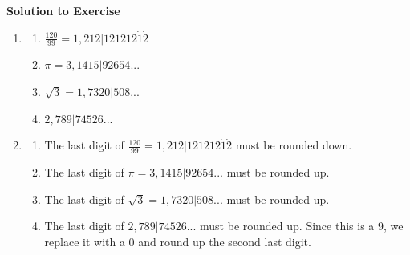 {\begin{mdframed}[linewidth=4, leftmargin=40, rightmargin=40]
\begin{exercise}
      
      \vspace{5pt}
      \label{m38349*solfhsst!!!underscore!!!id212}\noindent\textbf{Solution to Exercise } \label{m38349*listfhsst!!!underscore!!!id212}\begin{enumerate}[noitemsep, label=\textbf{Step} \textbf{\arabic*}. ] 
            \leftskip=20pt\rightskip=\leftskip\item  
      \label{m38349*id325360}\begin{enumerate}[noitemsep, label=\textbf{\alph*}. ] 
            \leftskip=20pt\rightskip=\leftskip\label{m38349*uid8}\item 
          \begin{math}\frac{120}{99}=1,212|121212\dot{1}\dot{2}\end{math}
        \label{m38349*uid9}\item 
          \begin{math}\pi =3,1415|92654...\end{math}
        \label{m38349*uid10}\item 
          \begin{math}\sqrt{3}=1,7320|508...\end{math}
        \item \begin{math}2,789|74526...\end{math}\end{enumerate}
        
      \item  
      \label{m38349*id325490}\begin{enumerate}[noitemsep, label=\textbf{\alph*}. ] 
            \leftskip=20pt\rightskip=\leftskip\label{m38349*uid11}\item The last digit of \begin{math}\frac{120}{99}=1,212|121212\dot{1}\dot{2}\end{math}  must be rounded down.
\label{m38349*uid12}\item The last digit of \begin{math}\pi =3,1415|92654...\end{math} must be rounded up.
\label{m38349*uid13}\item The last digit of \begin{math}\sqrt{3}=1,7320|508...\end{math} must be rounded up.
\item  The last digit of \begin{math}2,789|74526...\end{math} must be rounded up. Since this is a 9, we replace it with a 0 and round up the second last digit.\end{enumerate}
        

\end{enumerate}
\end{exercise}
\end{mdframed}}
